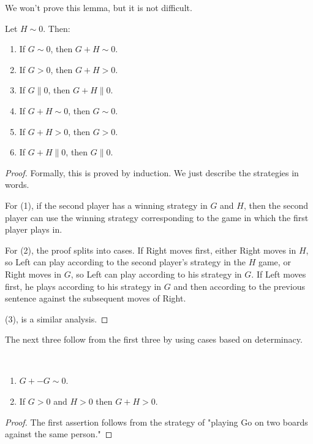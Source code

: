 We won't prove this lemma, but it is not difficult.

\begin{lemma} %
Let $H\sim 0$. Then:
\begin{enumerate}
  \item  If $G\sim 0$, then $G+H\sim 0$.
  \item  If $G>0$, then $G+H>0$.
  \item  If $G\parallel 0$, then $G+H\parallel 0$.
  \item  If $G+H\sim 0$, then $G\sim 0$.
  \item  If $G+H>0$, then $G>0$.
  \item  If $G+H\parallel 0$, then $G\parallel 0$.
\end{enumerate}
 \end{lemma}

\begin{proof} %

Formally, this is proved by induction. We just describe the strategies in words.

For (1), if the second player has a winning strategy in $G$ and $H$, then the second player can use the winning strategy corresponding to the game in which the first player plays in.

For (2), the proof splits into cases. If Right moves first, either Right moves in $H$, so Left can play according to the second player's strategy in the $H$ game, or Right moves in $G$, so Left can play according to his strategy in $G$. If Left moves first, he plays according to his strategy in $G$ and then according to the previous sentence against the subsequent moves of Right.

(3), is a similar analysis.
 \end{proof}

The next three follow from the first three by using cases based on determinacy.

\begin{lemma}\ %
\begin{enumerate}
  \item  $G+ -G\sim 0$.
  \item  If $G>0$ and $H>0$ then $G+H>0$.
\end{enumerate}
 \end{lemma}

\begin{proof} %

The first assertion follows from the strategy of "playing Go on two boards against the same person."
 \end{proof}

